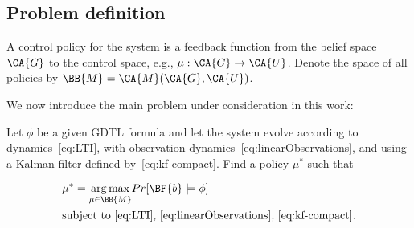 \subsection{Problem definition}

\begin{definition}[Policy]
A control policy for the system is a feedback function from the belief space
$\CA{G}$ to the control space, e.g., $\mu : \CA{G} \to \CA{U}$.
Denote the space of all policies by $\BB{M} = \CA{M}(\CA{G}, \CA{U})$.
\end{definition}

\noindent
We now introduce the main problem under consideration in this work:

\begin{problem}
\label{pb:mpp}
Let $\phi$ be a given GDTL formula and let the system
evolve according to dynamics~\eqref{eq:LTI},
with observation dynamics~\eqref{eq:linearObservations},
and using a Kalman filter defined by~\eqref{eq:kf-compact}.
Find a policy
$\mu^*$ such that 

\begin{equation}
\label{eq:mpp}
\begin{aligned}
&\mu^* = \underset{\mu \in \BB{M}}{\arg \max}Pr[\BF{b} \models \phi] \\
&\text{subject to~\eqref{eq:LTI},~\eqref{eq:linearObservations},~\eqref{eq:kf-compact}.}  \\
\end{aligned}
\end{equation}

\end{problem}



